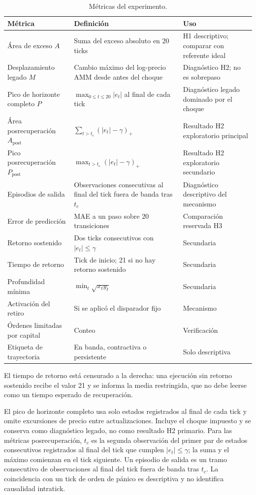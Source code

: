 \begin{table}[htbp]
\centering
\caption{Métricas del experimento.}
\label{tab:metricas}
\small
\begin{tabularx}{\textwidth}{@{}l >{\raggedright\arraybackslash}X l@{}}
\toprule
Métrica & Definición & Uso \\
\midrule
Área de exceso $A$ & Suma del exceso absoluto en 20 ticks & H1 descriptivo; comparar con referente ideal \\
Desplazamiento legado $M$ & Cambio máximo del log-precio AMM desde antes del choque & Diagnóstico H2; no es sobrepaso \\
Pico de horizonte completo $P$ & $\max_{0\le t\le20}|e_t|$ al final de cada tick & Diagnóstico legado dominado por el choque \\
Área posrecuperación $A_{\mathrm{post}}$ & $\sum_{t>t_c}(|e_t|-\gamma)_+$ & Resultado H2 exploratorio principal \\
Pico posrecuperación $P_{\mathrm{post}}$ & $\max_{t>t_c}(|e_t|-\gamma)_+$ & Resultado H2 exploratorio secundario \\
Episodios de salida & Observaciones consecutivas al final del tick fuera de banda tras $t_c$ & Diagnóstico descriptivo del mecanismo \\
Error de predicción & MAE a un paso sobre 20 transiciones & Comparación reservada H3 \\
Retorno sostenido & Dos ticks consecutivos con $|e_t|\le\gamma$ & Secundaria \\
Tiempo de retorno & Tick de inicio; 21 si no hay retorno sostenido & Secundaria \\
Profundidad mínima & $\min_t\sqrt{x_ty_t}$ & Secundaria \\
Activación del retiro & Si se aplicó el disparador fijo & Mecanismo \\
Órdenes limitadas por capital & Conteo & Verificación \\
Etiqueta de trayectoria & En banda, contractiva o persistente & Solo descriptiva \\
\bottomrule
\end{tabularx}
\end{table}

El tiempo de retorno está censurado a la derecha: una ejecución sin retorno sostenido recibe el valor 21 y se informa la media restringida, que no debe leerse como un tiempo esperado de recuperación.

El pico de horizonte completo usa solo estados registrados al final de cada tick y omite excursiones de precio entre actualizaciones. Incluye el choque impuesto y se conserva como diagnóstico legado, no como resultado H2 primario. Para las métricas posrecuperación, $t_c$ es la segunda observación del primer par de estados consecutivos registrados al final del tick que cumplen $|e_t|\le\gamma$; la suma y el máximo comienzan en el tick siguiente. Un episodio de salida es un tramo consecutivo de observaciones al final del tick fuera de banda tras $t_c$. La coincidencia con un tick de orden de pánico es descriptiva y no identifica causalidad intratick.


